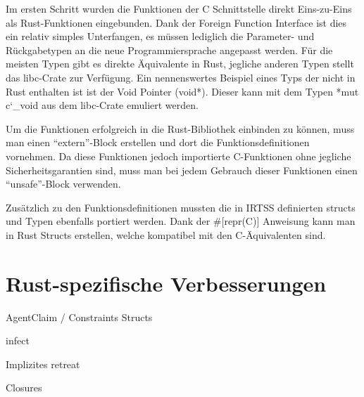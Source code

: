 Im ersten Schritt wurden die Funktionen der C Schnittstelle direkt Eins-zu-Eins als Rust-Funktionen eingebunden. Dank der
Foreign Function Interface ist dies ein relativ simples Unterfangen, es müssen lediglich die Parameter- und Rückgabetypen
an die neue Programmiersprache angepasst werden. Für die meisten Typen gibt es direkte Äquivalente in Rust, jegliche anderen Typen
stellt das libc-Crate zur Verfügung. Ein nennenswertes Beispiel eines Typs der nicht in Rust enthalten ist ist der
Void Pointer (void*). Dieser kann mit dem Typen *mut c\char`_void aus dem libc-Crate emuliert werden.

Um die Funktionen erfolgreich in die Rust-Bibliothek einbinden zu können, muss man einen ``extern''-Block erstellen und dort
die Funktionsdefinitionen vornehmen. Da diese Funktionen jedoch importierte C-Funktionen ohne jegliche Sicherheitsgarantien
sind, muss man bei jedem Gebrauch dieser Funktionen einen ``unsafe''-Block verwenden.

Zusätzlich zu den Funktionsdefinitionen mussten die in IRTSS definierten structs und Typen ebenfalls portiert werden.
Dank der #[repr(C)] Anweisung kann man in Rust Structs erstellen, welche kompatibel mit den C-Äquivalenten sind.

\section{Rust-spezifische Verbesserungen}

AgentClaim / Constraints Structs

infect

Implizites retreat

Closures

